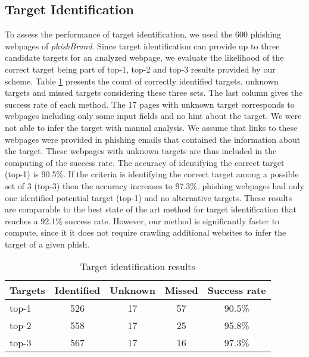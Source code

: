 \documentclass[10pt,conference,compsocconf,letterpaper]{IEEEtran}
\begin{document}
\subsection{Target Identification}
\label{subsec:target_eval}

To assess the performance of target identification, we used the 600 phishing webpages of \textit{phishBrand}.
Since target identification can provide up to three candidate targets for an analyzed webpage, we evaluate the likelihood of the correct target being part of top-1, top-2 and top-3 results provided by our scheme.
Table \ref{tab:target_results} presents the count of correctly identified targets, unknown targets and missed targets considering these three sets. The last column gives the success rate of each method. 
The 17 pages with unknown target corresponds to webpages including only some input fields and no hint about the target. We were not able to infer the target with manual analysis. 
\iffeateval
We assume that links to these webpages were provided in phishing emails that contained the information about the target.
\fi
These webpages with unknown targets are thus included in the computing of the success rate.
The accuracy of identifying the correct target (top-1) is 90.5\%. If the criteria is identifying the correct target among a possible set of 3 (top-3) then the accuracy increases to 97.3\%.
 phishing webpages had only one identified potential target (top-1) and no alternative targets.
\fi
These results are comparable to the best state of the art method for target identification \cite{liu:2012:anti} that reaches a 92.1\% success rate.
\iffeateval
However, our method is significantly faster to compute, since it it does not require crawling additional websites to infer the target of a given phish.
\fi


\begin{table}[tbh]
\caption{Target identification results} \centering
\begin{tabular}{l c c c c}

\textbf{Targets} & \textbf{Identified} & \textbf{Unknown} & \textbf{Missed} & \textbf{Success rate} \\ \hline
top-1 & 526 & 17 & 57  & 90.5\%\\
top-2 & 558 & 17  & 25 & 95.8\%\\
top-3 & 567 & 17 & 16 & 97.3\%\\
\end{tabular}
\label{tab:target_results}
\end{table}
\end{document}
